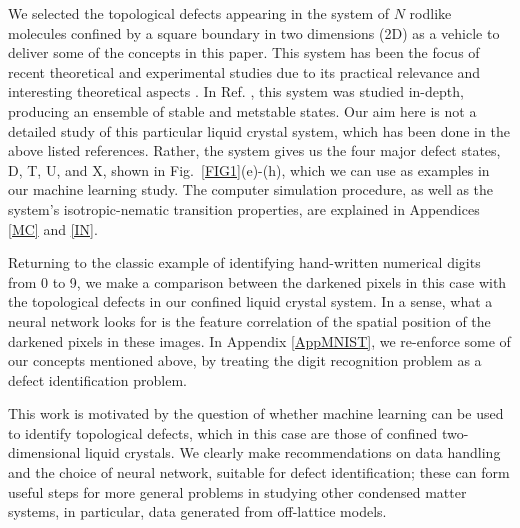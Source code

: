 We selected the topological defects appearing in the system of $N$ rodlike molecules confined by a square boundary in two dimensions (2D) as a
vehicle to deliver some of the concepts in this paper. This system has been the focus of recent theoretical and experimental studies due to its practical relevance \cite{Galanis2006,Mulder2011,Lewis2014,Cortes2017} and interesting theoretical aspects \cite{Tsakonas2007,Luo2012,chen2013rods,Mulder2015,Lewis2014}.
In Ref. \cite{yao}, this system was studied in-depth, producing an ensemble of stable and metstable states. Our aim here is not a detailed study of this particular liquid crystal system, which has been done in the above listed references.
Rather, the system gives us the four major defect states, D, T, U, and X, shown in Fig.\ \ref{FIG1}(e)-(h), which we can use as examples in our machine learning study. The computer simulation procedure, as well as the system's isotropic-nematic transition properties, are explained in Appendices \ref{MC} and \ref{IN}.

Returning to the classic example of identifying hand-written numerical digits from 0 to 9, we make a comparison between the darkened pixels in this case with the topological defects in our confined liquid crystal system. In a sense, what a neural network looks for is the feature correlation of the spatial position of the darkened pixels in these images. In Appendix \ref{AppMNIST}, we re-enforce some of our concepts mentioned above, by treating the digit recognition problem as a defect identification problem.

This work is motivated by the question of whether machine learning can be used to identify topological defects, which in this case are those of confined two-dimensional liquid crystals. We clearly make recommendations on data handling and
the choice of neural network, suitable for defect identification; these can form useful steps for  more general problems in studying other condensed matter systems, in particular, data generated from off-lattice models.




